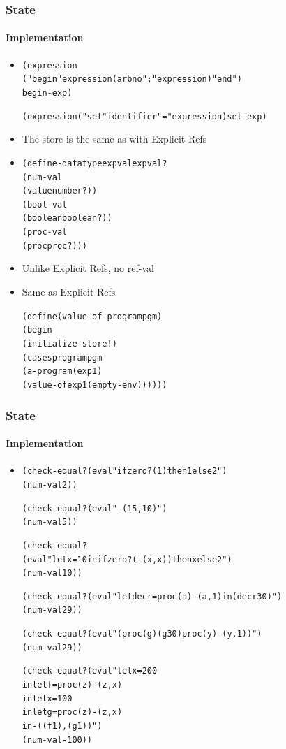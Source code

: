 \documentclass{beamer}
\begin{document}
\begin{frame}[fragile]
\frametitle{State}
\framesubtitle{Implementation}
\begin{scriptsize}
\begin{itemize}
\item<1->
\begin{alltt}
(expression
     ("begin" expression (arbno ";" expression) "end")
     begin-exp)

(expression ("set" identifier "=" expression)  set-exp)
\end{alltt}

\item<2-> The store is the same as with Explicit Refs

\item<3->
\begin{alltt}
(define-datatype expval expval?
  (num-val
   (value number?))
  (bool-val
   (boolean boolean?))
  (proc-val
   (proc proc?)))
\end{alltt}

\item<3-> Unlike Explicit Refs, no ref-val

\item<4-> Same as Explicit Refs
\begin{alltt}
(define (value-of-program pgm)
  (begin
    (initialize-store!)
    (cases program pgm
      (a-program (exp1)
                 (value-of exp1 (empty-env))))))
\end{alltt}

\end{itemize}
\end{scriptsize}
\end{frame}

\begin{frame}[fragile]
\frametitle{State}
\framesubtitle{Implementation}
\begin{scriptsize}
\begin{itemize}
\item<1->
\begin{alltt}
(check-equal? (eval "if zero?(1) then 1 else 2")
              (num-val 2))

(check-equal? (eval "-(15, 10)")
              (num-val 5))

(check-equal?
  (eval "let x = 10 in if zero?(-(x, x)) then x else 2")
  (num-val 10))

(check-equal? (eval "let decr = proc (a) -(a, 1) in (decr 30)")
              (num-val 29))

(check-equal? (eval "( proc (g) (g 30) proc (y) -(y, 1))")
              (num-val 29))

(check-equal? (eval "let x = 200
                     in let f = proc (z) -(z, x)
                        in let x = 100
                           in let g = proc (z) -(z, x)
                              in -((f 1), (g 1))")
              (num-val -100))
\end{alltt}

\end{itemize}
\end{scriptsize}
\end{frame}
\end{document}
